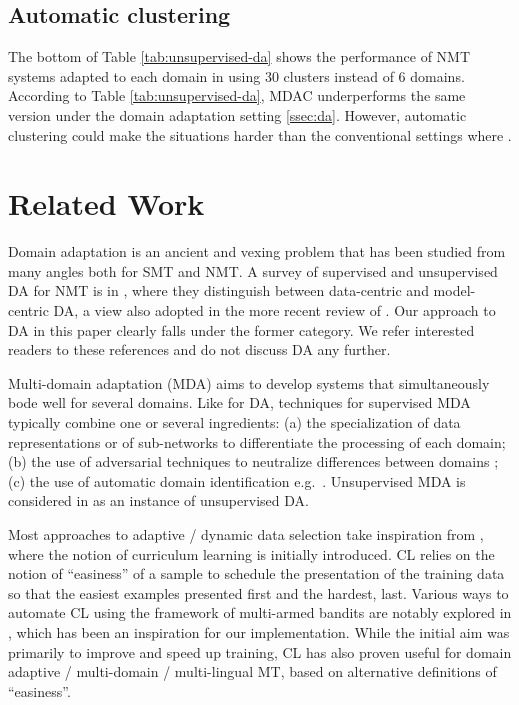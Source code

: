 \documentclass[11pt]{article}
\newcommand{\fyTodo}[1]{\Todo[FY:]{\textcolor{orange}{#1}}}
\newcommand{\fyDone}[1]{\done[FY]\Todo[FY:]{\textcolor{orange}{#1}}}
\begin{document}
\subsection{Automatic clustering}\label{ssec:clda}
The bottom of Table \ref{tab:unsupervised-da} shows the performance of NMT systems adapted to each domain in using 30 clusters instead of 6 domains. According to Table \ref{tab:unsupervised-da}, MDAC underperforms the same version under the domain adaptation setting \ref{ssec:da}. However, automatic clustering could make the situations harder than the conventional settings where \fyTodo{more discussion here}.

\section{Related Work \label{sec:related}}

Domain adaptation is an ancient and vexing problem that has been studied from many angles both for SMT and NMT. A survey of supervised and unsupervised DA for NMT is in \citet{Chu18asurvey}, where they distinguish between data-centric and model-centric DA, a view also adopted in the more recent review of \citet{Saunders21domain}. Our approach to DA in this paper clearly falls under the former category. We refer interested readers to these references and do not discuss DA any further.

Multi-domain adaptation (MDA) aims to develop systems that simultaneously bode well for several domains. Like for DA, techniques for supervised MDA typically combine one or several ingredients: (a) the specialization of data representations \citep{Kobus17domaincontrol} or of sub-networks \citep{Pham19generic} to differentiate the processing of each domain; (b) the use of adversarial techniques to neutralize differences between domains \citep{Britz17mixing,Zeng18multidomain}; (c) the use of automatic domain identification e.g.\ \citet{Jiang19multidomain}. Unsupervised MDA is considered in \citet{Farajian17multidomain} as an instance of unsupervised DA.

Most approaches to adaptive / dynamic data selection take inspiration from \citet{Bengio09curriculum}, where the notion of curriculum learning is initially introduced. CL relies on the notion of ``easiness'' of a sample to schedule the presentation of the training data so that the easiest examples presented first and the hardest, last. Various ways to automate CL using the framework of multi-armed bandits are notably explored in \citep{Graves17automated}, which has been an inspiration for our implementation. While the initial aim was primarily to improve and speed up training, CL has also proven useful for domain adaptive / multi-domain / multi-lingual MT, based on alternative definitions of ``easiness''.\fyDone{Ajouter Grave}
\end{document}
